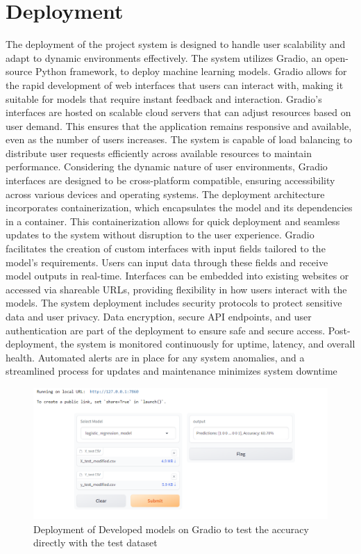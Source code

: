 \documentclass[journal,transmag]{J-NaNA}
\begin{document}
\section{Deployment}
The deployment of the project system is designed to handle user scalability and adapt to dynamic environments effectively. The system utilizes Gradio, an open-source Python framework, to deploy machine learning models. Gradio allows for the rapid development of web interfaces that users can interact with, making it suitable for models that require instant feedback and interaction. Gradio's interfaces are hosted on scalable cloud servers that can adjust resources based on user demand. This ensures that the application remains responsive and available, even as the number of users increases. The system is capable of load balancing to distribute user requests efficiently across available resources to maintain performance. Considering the dynamic nature of user environments, Gradio interfaces are designed to be cross-platform compatible, ensuring accessibility across various devices and operating systems. The deployment architecture incorporates containerization, which encapsulates the model and its dependencies in a container. This containerization allows for quick deployment and seamless updates to the system without disruption to the user experience. Gradio facilitates the creation of custom interfaces with input fields tailored to the model's requirements. Users can input data through these fields and receive model outputs in real-time. Interfaces can be embedded into existing websites or accessed via shareable URLs, providing flexibility in how users interact with the models. The system deployment includes security protocols to protect sensitive data and user privacy. Data encryption, secure API endpoints, and user authentication are part of the deployment to ensure safe and secure access. Post-deployment, the system is monitored continuously for uptime, latency, and overall health. Automated alerts are in place for any system anomalies, and a streamlined process for updates and maintenance minimizes system downtime 

\begin{figure}[htbp]
\centering
\includegraphics[width=\linewidth]{deployment.png} 
\caption{Deployment of Developed models on Gradio to test the accuracy directly with the test dataset} 
\label{fig: post-hyper-parameter-tuning} %
\end{figure}
\end{document}
